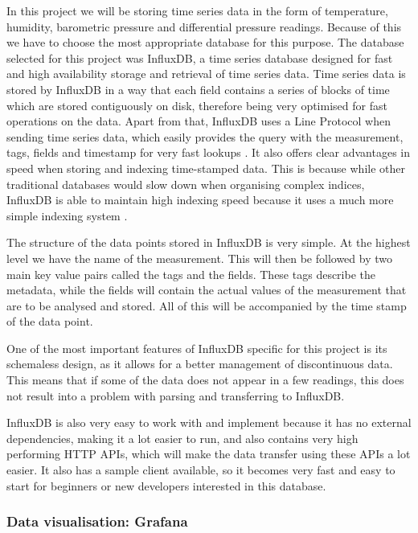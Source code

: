 \documentclass[12pt]{article}
\begin{document}
In this project we will be storing time series data in the form of temperature, humidity, barometric pressure and differential pressure readings. Because of this we have to choose the most appropriate database for this purpose. The database selected for this project was InfluxDB, a time series database designed for fast and high availability storage and retrieval of time series data. Time series data is stored by InfluxDB in a way that each field contains a series of blocks of time which are stored contiguously on disk, therefore being very optimised for fast operations on the data. Apart from that, InfluxDB uses a Line Protocol when sending time series data, which easily provides the query with the measurement, tags, fields and timestamp for very fast lookups \cite{influx:time-series}. It also offers clear advantages in speed when storing and indexing time-stamped data. This is because while other traditional databases would slow down when organising complex indices, InfluxDB is able to maintain high indexing speed because it uses a much more simple indexing system \cite{ionos}. \par

The structure of the data points stored in InfluxDB is very simple. At the highest level we have the name of the measurement. This will then be followed by two main key value pairs called the tags and the fields. These tags describe the metadata, while the fields will contain the actual values of the measurement that are to be analysed and stored. All of this will be accompanied by the time stamp of the data point. \par

One of the most important features of InfluxDB specific for this project is its schemaless design, as it allows for a better management of discontinuous data. This means that if some of the data does not appear in a few readings, this does not result into a problem with parsing and transferring to InfluxDB.\par 

InfluxDB is also very easy to work with and implement because it has no external dependencies, making it a lot easier to run, and also contains very high performing HTTP APIs, which will make the data transfer using these APIs a lot easier. It also has a sample client available, so it becomes very fast and easy to start for beginners or new developers interested in this database.

\subsubsection{Data visualisation: Grafana}
\end{document}
